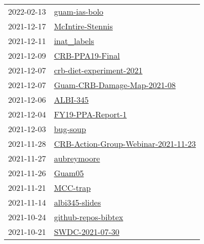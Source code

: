 \begin{longtable}{ll}
2022-02-13 &                                               \href{https://github.com/aubreymoore/guam-ias-bolo}{guam-ias-bolo} \\
2021-12-17 &                                         \href{https://github.com/aubreymoore/McIntire-Stennis}{McIntire-Stennis} \\
2021-12-11 &                                                   \href{https://github.com/aubreymoore/inat\_labels}{inat\_labels} \\
2021-12-09 &                                           \href{https://github.com/aubreymoore/CRB-PPA19-Final}{CRB-PPA19-Final} \\
2021-12-07 &                         \href{https://github.com/aubreymoore/crb-diet-experiment-2021}{crb-diet-experiment-2021} \\
2021-12-07 &                   \href{https://github.com/aubreymoore/Guam-CRB-Damage-Map-2021-08}{Guam-CRB-Damage-Map-2021-08} \\
2021-12-06 &                                                         \href{https://github.com/aubreymoore/ALBI-345}{ALBI-345} \\
2021-12-04 &                                       \href{https://github.com/aubreymoore/FY19-PPA-Report-1}{FY19-PPA-Report-1} \\
2021-12-03 &                                                         \href{https://github.com/aubreymoore/bug-soup}{bug-soup} \\
2021-11-28 &   \href{https://github.com/aubreymoore/CRB-Action-Group-Webinar-2021-11-23}{CRB-Action-Group-Webinar-2021-11-23} \\
2021-11-27 &                                                   \href{https://github.com/aubreymoore/aubreymoore}{aubreymoore} \\
2021-11-26 &                                                             \href{https://github.com/aubreymoore/Guam05}{Guam05} \\
2021-11-21 &                                                         \href{https://github.com/aubreymoore/MCC-trap}{MCC-trap} \\
2021-11-14 &                                             \href{https://github.com/aubreymoore/albi345-slides}{albi345-slides} \\
2021-10-24 &                                   \href{https://github.com/aubreymoore/github-repos-bibtex}{github-repos-bibtex} \\
2021-10-21 &                                           \href{https://github.com/aubreymoore/SWDC-2021-07-30}{SWDC-2021-07-30} \\

\end{longtable}
